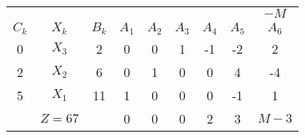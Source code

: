    \begin{tabular}{ccccccccc}
    \hline
    \hline
            &         &         &         &         &         &         &         & $-M$ \bigstrut[t]\\
    $C_k$   & $X_k$   & $B_k$   & $A_1$   & $A_2$   & $A_3$   & $A_4$   & $A_5$   & $A_6$ \bigstrut[b]\\
    \hline
    0       & $X_3$   & 2       & 0       & 0       & 1       & -1      & -2      & 2 \bigstrut[t]\\
    2       & $X_2$   & 6       & 0       & 1       & 0       & 0       & 4       & -4 \\
    5       & $X_1$   & 11      & 1       & 0       & 0       & 0       & -1      & 1 \bigstrut[b]\\
    \hline
            & $Z=67$  &         & 0       & 0       & 0       & 2       & 3       & $M-3$ \bigstrut\\
    \hline
    \hline
    \end{tabular}%
